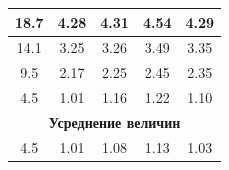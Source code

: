 \documentclass[a4paper,12pt]{report}
\begin{document}
\begin{table}[]
{\begin{tabular}{|c|c|c|c|c|}
18.7                                                                                             & 4.28                                                                                 & 4.31                                                                                   & 4.54                                                                                 & 4.29                                                                                    \\ \hline
14.1                                                                                             & 3.25                                                                                 & 3.26                                                                                   & 3.49                                                                                 & 3.35                                                                                    \\ \hline
9.5                                                                                              & 2.17                                                                                 & 2.25                                                                                   & 2.45                                                                                 & 2.35                                                                                    \\ \hline
4.5                                                                                              & 1.01                                                                                 & 1.16                                                                                   & 1.22                                                                                 & 1.10                                                                                    \\ \hline
\multicolumn{5}{|c|}{\textbf{Усреднение величин}}                                                                                                                                                                                                                                                                                                                                                                                                                 \\ \hline
4.5                                                                                              & 1.01                                                                                 & 1.08                                                                                   & 1.13                                                                                 & 1.03                                                                                    \\ \hline

\end{tabular}}
\end{table}
\end{document}
